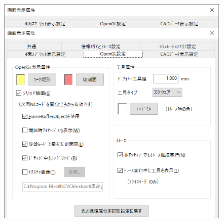 \begin{minipage}[t]{0.38\textwidth}
　
\end{minipage}
\begin{minipage}[t]{0.02\textwidth}
　
\end{minipage}
\begin{minipage}[t]{0.6\textwidth}
\vspace*{-2zh}
\begin{figure}[H]
\centering
\includegraphics[width=\textwidth]{No6/fig/disp5.png}
\label{fig:disp5.png}
\end{figure}
\end{minipage}

